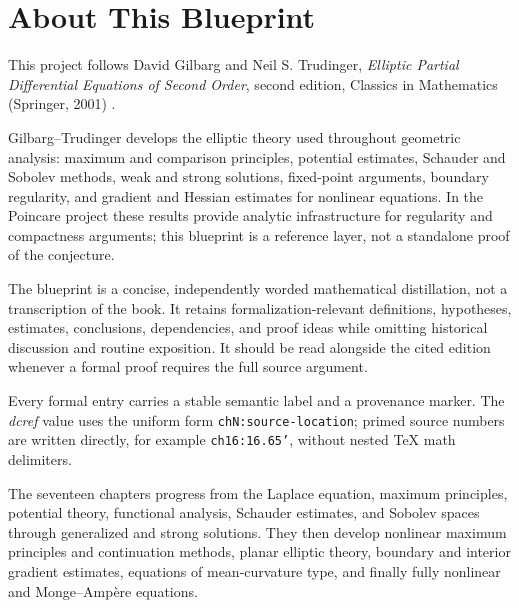 

\chapter*{About This Blueprint}

This project follows David Gilbarg and Neil S. Trudinger, \emph{Elliptic
Partial Differential Equations of Second Order}, second edition, Classics in
Mathematics (Springer, 2001) \cite{gilbargtrudinger2001}.

Gilbarg--Trudinger develops the elliptic theory used throughout geometric
analysis: maximum and comparison principles, potential estimates, Schauder and
Sobolev methods, weak and strong solutions, fixed-point arguments, boundary
regularity, and gradient and Hessian estimates for nonlinear equations.  In the
Poincare project these results provide analytic infrastructure for regularity
and compactness arguments; this blueprint is a reference layer, not a
standalone proof of the conjecture.

The blueprint is a concise, independently worded mathematical distillation,
not a transcription of the book.  It retains formalization-relevant
definitions, hypotheses, estimates, conclusions, dependencies, and proof
ideas while omitting historical discussion and routine exposition.  It should
be read alongside the cited edition whenever a formal proof requires the full
source argument.

Every formal entry carries a stable semantic label and a provenance marker.
The \emph{dcref} value uses the uniform form
\texttt{chN:source-location}; primed source numbers are written directly, for
example \texttt{ch16:16.65'}, without nested TeX math delimiters.

The seventeen chapters progress from the Laplace equation, maximum principles,
potential theory, functional analysis, Schauder estimates, and Sobolev spaces
through generalized and strong solutions.  They then develop nonlinear maximum
principles and continuation methods, planar elliptic theory, boundary and
interior gradient estimates, equations of mean-curvature type, and finally
fully nonlinear and Monge--Amp\`ere equations.


















